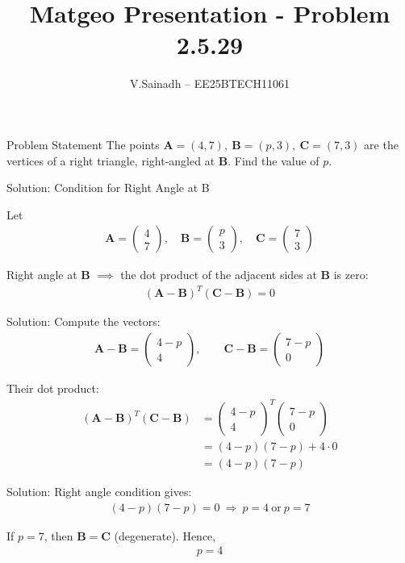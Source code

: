 \documentclass{beamer}
\title{Matgeo Presentation - Problem 2.5.29}
\author{V.Sainadh -- EE25BTECH11061}
\numberwithin{equation}{section}
\newcommand{\myvec}[1]{\ensuremath{\begin{pmatrix}#1\end{pmatrix}}}
\let\vec\mathbf
\begin{document}
\begin{frame}

\titlepage

\end{frame}

\begin{frame}{Problem Statement}
The points $\vec{A} = (4,7),\ \vec{B} = (p,3),\ \vec{C} = (7,3)$ are the vertices of a right triangle, 
right-angled at $\vec{B}$. Find the value of $p$.
\end{frame}

\begin{frame}{Solution: Condition for Right Angle at B}

Let
\begin{align}
\vec{A}=\myvec{4\\7},\quad
\vec{B}=\myvec{p\\3},\quad
\vec{C}=\myvec{7\\3}
\end{align}

Right angle at \(\vec{B}\) \(\implies\) the dot product of the adjacent sides at \(\vec{B}\) is zero:
\begin{align}
(\vec{A}-\vec{B})^T(\vec{C}-\vec{B})=0
\end{align}



\end{frame}

\begin{frame}{Solution: }
Compute the vectors:
\begin{align}
\vec{A}-\vec{B}=\myvec{4-p\\4},\qquad
\vec{C}-\vec{B}=\myvec{7-p\\0}
\end{align}

Their dot product:
\begin{align}
(\vec{A}-\vec{B})^T(\vec{C}-\vec{B})
&= \myvec{4-p\\4}^T\myvec{7-p\\0} \\
&= (4-p)(7-p)+4\cdot 0 \\
&= (4-p)(7-p)
\end{align}


\end{frame}

\begin{frame}{Solution: }
    Right angle condition gives:
\begin{align}
(4-p)(7-p)=0 \ \Rightarrow\ p=4\ \text{or}\ p=7
\end{align}

If \(p=7\), then \(\vec{B}=\vec{C}\) (degenerate). Hence,
\begin{align}
\boxed{p=4}
\end{align}

\end{frame}
\end{document}
